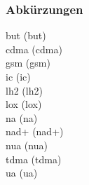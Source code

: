 \subsubsection{Abkürzungen}
\acrshort{but} (\acrlong{but})\\
\acrshort{cdma} (\acrlong{cdma})\\
\acrshort{gsm} (\acrlong{gsm})\\
\acrshort{ic} (\acrlong{ic})\\
\acrshort{lh2} (\acrlong{lh2})\\
\acrshort{lox} (\acrlong{lox})\\
\acrshort{na} (\acrlong{na})\\
\acrshort{nad+} (\acrlong{nad+})\\
\acrshort{nua} (\acrlong{nua})\\
\acrshort{tdma} (\acrlong{tdma})\\
\acrshort{ua} (\acrlong{ua})\\


